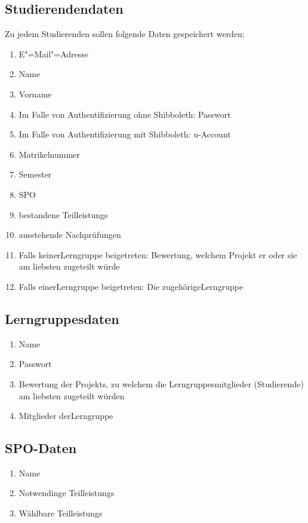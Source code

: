 \documentclass[parskip=full]{scrartcl}
\newcommand{\swtLabel}[1]{\textbf{/#1\arabic*0/}}
\begin{document}
\subsection{Studierendendaten} 
Zu jedem Studierenden sollen folgende Daten gespeichert werden:
\begin{enumerate}[label=\swtLabel{D}, resume] 
  \item E"=Mail"=Adresse \label{SDatenAnfang}
  \item Name
  \item Vorname
  \item Im Falle von Authentifizierung ohne Shibboleth: Passwort
  \item Im Falle von Authentifizierung mit Shibboleth: u-Account
  \item Matrikelnummer
  \item Semester
  \item SPO
  \item bestandene \glspl{Teilleistung} 
  \item ausstehende Nachprüfungen \label{SDatenEnde}
  \item Falls keiner\gls{Lerngruppe} beigetreten: Bewertung, welchem Projekt er oder
  sie am liebsten zugeteilt würde
  \item Falls einer\gls{Lerngruppe} beigetreten: Die zugehörige\gls{Lerngruppe}
  
\end{enumerate}
\subsection{\glspl{Lerngruppe}daten} 
\begin{enumerate}[label=\swtLabel{D}, resume] 
  \item Name
  \item Passwort
  \item Bewertung der \glspl{Projekt}, zu welchem die \glspl{Lerngruppe}mitglieder
  (Studierende) am liebsten zugeteilt würden
  \item Mitglieder der\gls{Lerngruppe}
\end{enumerate}

\subsection{SPO-Daten}
\begin{enumerate}[label=\swtLabel{D}, resume]
	\item Name
	\item Notwendinge \glspl{Teilleistung}
	\item Wählbare \glspl{Teilleistung}
\end{enumerate}
\end{document}
